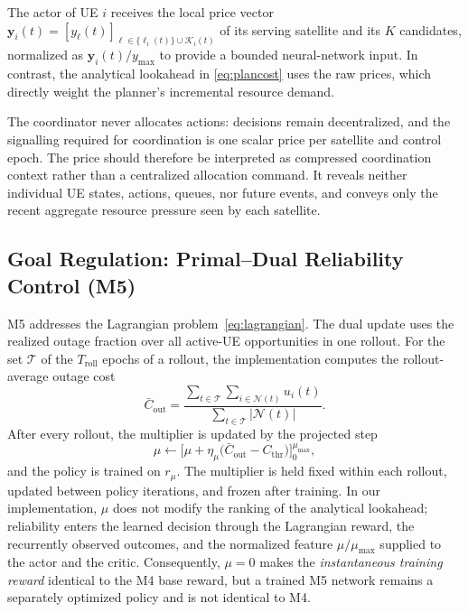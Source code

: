 \documentclass[journal]{IEEEtran}
\newcommand{\Nset}{\mathcal{N}}
\begin{document}
The actor of UE $i$ receives the local price vector
$\mathbf{y}_i(t)=[y_\ell(t)]_{\ell\in\{\ell_i(t)\}\cup\mathcal{K}_i(t)}$ of its
serving satellite and its $K$ candidates, normalized as
$\mathbf{y}_i(t)/y_{\max}$ to provide a bounded neural-network input. In
contrast, the analytical lookahead in \eqref{eq:plancost} uses the raw prices,
which directly weight the planner's incremental resource demand.

The coordinator never allocates actions: decisions remain decentralized, and
the signalling required for coordination is one scalar price per satellite and
control epoch. The price should therefore be interpreted as compressed
coordination context rather than a centralized allocation command. It reveals
neither individual UE states, actions, queues, nor future events, and conveys
only the recent aggregate resource pressure seen by each satellite.

\subsection{Goal Regulation: Primal--Dual Reliability Control (M5)}

M5 addresses the Lagrangian problem~\eqref{eq:lagrangian}. The dual update
uses the realized outage fraction over all active-UE opportunities in one
rollout. For the set $\mathcal{T}$ of the $T_{\mathrm{roll}}$ epochs of a
rollout, the implementation computes the rollout-average outage cost
\begin{equation}
\bar C_{\mathrm{out}}=
\frac{\sum_{t\in\mathcal{T}}\sum_{i\in\Nset(t)}u_i(t)}{\sum_{t\in\mathcal{T}}|\Nset(t)|}.
\end{equation}
After every rollout, the multiplier is updated by the projected step
\begin{equation}
\mu\leftarrow\Big[\mu+\eta_\mu\big(\bar C_{\mathrm{out}}-C_{\mathrm{thr}}\big)\Big]_0^{\mu_{\max}},
\label{eq:dual}
\end{equation}
and the policy is trained on $r_\mu$. The multiplier is held fixed within
each rollout, updated between policy iterations, and frozen after training.
In our implementation, $\mu$ does not modify the ranking of the analytical
lookahead; reliability enters the learned decision through the Lagrangian
reward, the recurrently observed outcomes, and the normalized feature
$\mu/\mu_{\max}$ supplied to the actor and the critic. Consequently, $\mu=0$
makes the \emph{instantaneous training reward} identical to the M4 base
reward, but a trained M5 network remains a separately optimized policy and is
not identical to M4.
\end{document}
